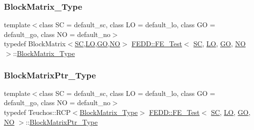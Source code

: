 \mbox{\label{classFEDD_1_1FE__Test_a7018ca0596aed7f7641f1b3262ff7ead}} 
\subsubsection{\texorpdfstring{Block\+Matrix\+\_\+\+Type}{BlockMatrix\_Type}}
{\footnotesize\ttfamily template$<$class SC  = default\+\_\+sc, class LO  = default\+\_\+lo, class GO  = default\+\_\+go, class NO  = default\+\_\+no$>$ \\
typedef Block\+Matrix$<$\hyperlink{fe__test__laplace_8cpp_a79c7e86a57edbb2a5a53242bcd04e41e}{SC},\hyperlink{fe__test__laplace_8cpp_ad6a38c9f07d3fd633eefca5bccad8410}{LO},\hyperlink{fe__test__laplace_8cpp_afa2946b509009b4f45eb04bd8c5b27d9}{GO},\hyperlink{fe__test__laplace_8cpp_a5e24f37b28787429872b6ecb1d0417ce}{NO}$>$ \hyperlink{classFEDD_1_1FE__Test}{F\+E\+D\+D\+::\+F\+E\+\_\+\+Test}$<$ \hyperlink{fe__test__laplace_8cpp_a79c7e86a57edbb2a5a53242bcd04e41e}{SC}, \hyperlink{fe__test__laplace_8cpp_ad6a38c9f07d3fd633eefca5bccad8410}{LO}, \hyperlink{fe__test__laplace_8cpp_afa2946b509009b4f45eb04bd8c5b27d9}{GO}, \hyperlink{fe__test__laplace_8cpp_a5e24f37b28787429872b6ecb1d0417ce}{NO} $>$\+::\hyperlink{classFEDD_1_1FE__Test_a7018ca0596aed7f7641f1b3262ff7ead}{Block\+Matrix\+\_\+\+Type}}

\mbox{\label{classFEDD_1_1FE__Test_a2b1edc85a8fab435be53fb22b843af9d}} 
\subsubsection{\texorpdfstring{Block\+Matrix\+Ptr\+\_\+\+Type}{BlockMatrixPtr\_Type}}
{\footnotesize\ttfamily template$<$class SC  = default\+\_\+sc, class LO  = default\+\_\+lo, class GO  = default\+\_\+go, class NO  = default\+\_\+no$>$ \\
typedef Teuchos\+::\+R\+CP$<$\hyperlink{classFEDD_1_1FE__Test_a7018ca0596aed7f7641f1b3262ff7ead}{Block\+Matrix\+\_\+\+Type}$>$ \hyperlink{classFEDD_1_1FE__Test}{F\+E\+D\+D\+::\+F\+E\+\_\+\+Test}$<$ \hyperlink{fe__test__laplace_8cpp_a79c7e86a57edbb2a5a53242bcd04e41e}{SC}, \hyperlink{fe__test__laplace_8cpp_ad6a38c9f07d3fd633eefca5bccad8410}{LO}, \hyperlink{fe__test__laplace_8cpp_afa2946b509009b4f45eb04bd8c5b27d9}{GO}, \hyperlink{fe__test__laplace_8cpp_a5e24f37b28787429872b6ecb1d0417ce}{NO} $>$\+::\hyperlink{classFEDD_1_1FE__Test_a2b1edc85a8fab435be53fb22b843af9d}{Block\+Matrix\+Ptr\+\_\+\+Type}}

